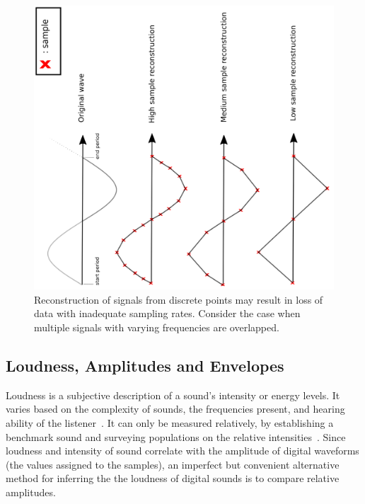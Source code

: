\documentclass[\main/thesis.tex]{subfiles}
\begin{document}
\begin{figure}[tbp]

\centering
\includegraphics[width=1\linewidth,angle =-90 ]{images/periodic_function_decimation.png}
\caption{Reconstruction of signals from discrete points may result in loss of data with inadequate sampling rates. Consider the case when multiple signals with varying frequencies are overlapped.} 
\label{fig_sampling_rate}
\end{figure}


\subsection{Loudness, Amplitudes and Envelopes}
Loudness is a subjective description of a sound's intensity or energy levels. It varies based on the complexity of sounds, the frequencies present, and hearing ability of the listener~\cite{fletcher1933loudness,cook1999chap6}. It can only be measured relatively, by establishing a benchmark sound and surveying populations on the relative intensities~\cite{cook1999chap6}. Since loudness and intensity of sound correlate with the amplitude of digital waveforms (the values assigned to the samples), an imperfect but convenient alternative method for inferring the the loudness of digital sounds is to compare relative amplitudes. 

\end{document}
